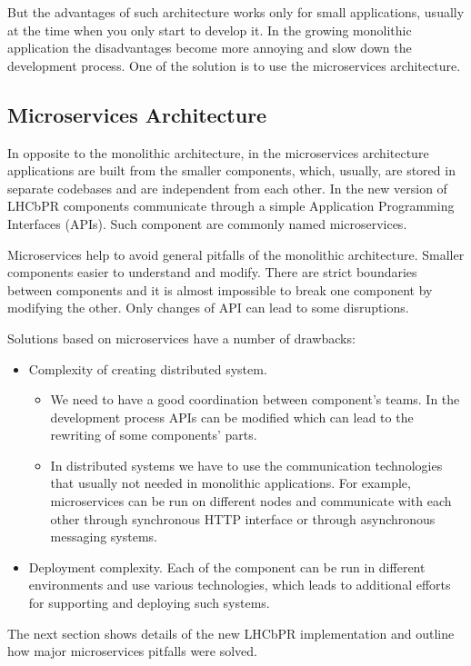 \documentclass[a4paper]{jpconf}
\begin{document}
But the advantages of such architecture works only for small applications,
usually at the time when you only start to develop it. In the growing
monolithic application the disadvantages become more annoying and slow down the
development process. One of the solution is to use the microservices architecture.  

\subsection{Microservices Architecture}

In opposite to the monolithic architecture, in the microservices architecture
applications are built from the smaller components, which, usually, are stored
in separate codebases and are independent from each other. In the new version of LHCbPR
components communicate through a simple Application Programming
Interfaces (APIs). Such component are commonly named microservices.

Microservices help to avoid general pitfalls of the monolithic architecture.
Smaller components easier to understand and modify. There are strict boundaries
between components and it is almost impossible to break one component by modifying
the other. Only changes of API can lead to some  disruptions.   

Solutions based on microservices have a number of drawbacks:
\begin{itemize}
\item Complexity of creating distributed system.
\begin{itemize}
\item We need to have a good coordination between component's teams. In 
the development process APIs can be modified which can lead to the rewriting of
some components' parts. 
\item In distributed systems we have to use the communication technologies that
usually not needed in monolithic applications. For example, microservices can be
run on different nodes and communicate with each other through synchronous HTTP
interface or through asynchronous messaging systems.  
\end{itemize}
\item Deployment complexity.  Each of the component can be run in  different
environments and use various technologies, which leads to additional efforts for
supporting and deploying such systems.
\end{itemize}

The next section shows details of the new LHCbPR implementation and outline how
major microservices pitfalls were solved.
\end{document}

